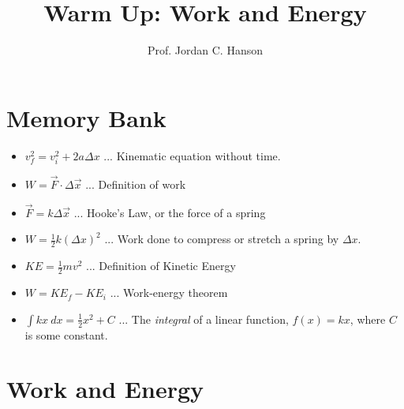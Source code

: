 \documentclass{article}
\begin{document}
\title{Warm Up: Work and Energy}
\author{Prof. Jordan C. Hanson}

\maketitle

\section{Memory Bank}

\begin{itemize}
\item $v_f^2 = v_i^2 + 2 a \Delta x$ ... Kinematic equation without time.
\item $W = \vec{F} \cdot \Delta \vec{x}$ ... Definition of work
\item $\vec{F} = k\Delta \vec{x}$ ... Hooke's Law, or the force of a spring
\item $W = \frac{1}{2}k(\Delta x)^2$ ... Work done to compress or stretch a spring by $\Delta x$.
\item $KE = \frac{1}{2}m v^2$ ... Definition of Kinetic Energy
\item $W = KE_f - KE_i$ ... Work-energy theorem
\item $\int k x ~ dx = \frac{1}{2}x^2 + C$ ... The \textit{integral} of a linear function, $f(x) = kx$, where $C$ is some constant.
\end{itemize}

\section{Work and Energy}
\end{document}
